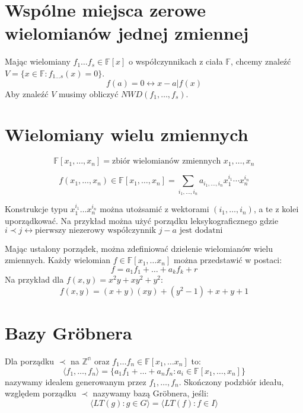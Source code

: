 \documentclass{../notatki}
\begin{document}
\section{Wspólne miejsca zerowe wielomianów jednej zmiennej}

Mając wielomiany $f_1 \dots f_s \in \mathbb{F}[x]$ o współczynnikach
z ciała $\mathbb{F}$, chcemy znaleźć $V = \{x \in \mathbb{F}: f_{1
\dots s}(x) = 0 \}$.
$$
f(a) = 0 \leftrightarrow x - a | f(x)
$$
Aby znaleźć $V$ musimy obliczyć $NWD(f_1, \dots, f_s)$.

\section{Wielomiany wielu zmiennych}

$$
\mathbb{F}[x_1, \dots, x_n] = \text{zbiór wielomianów zmiennych }
x_1, \dots, x_n
$$

$$
f(x_1, \dots, x_n) \in \mathbb{F}[x_1, \dots, x_n] = \sum_{i_1, \dots,
i_n} a_{i_1, \dots, i_n} x_1^{i_1} \cdots x_n^{i_n}
$$

Konstrukcje typu $x_1^{i_1} \dots x_n^{i_n}$ można utożsamić z
wektorami $(i_1, \dots, i_n)$, a te z kolei uporządkować. Na przykład można użyć
porządku leksykograficznego gdzie $i \prec j \leftrightarrow
\text{pierwszy niezerowy współczynnik } j - a \text{ jest dodatni}$

Mając ustalony porządek, można zdefiniować dzielenie wielomianów
wielu zmiennych. Każdy wielomian $f \in \mathbb{F}[x_1, \dots x_n]$
można przedstawić w postaci:
$$
f = a_1f_1 + \dots + a_kf_k + r
$$
Na przykład dla $f(x, y) = x^2y + xy^2 + y^2$:
$$
f(x, y) = (x + y)(xy) + (y^2 - 1) + x + y + 1
$$

\section{Bazy Gröbnera}

Dla porządku $\prec$ na $\mathbb{Z^n}$ oraz $f_1 \dots f_n \in
\mathbb{F}[x_1, \dots x_n]$ to:
$$
\langle f_1, \dots, f_n \rangle = \{a_1f_1 + \dots + a_nf_n : a_i \in
\mathbb{F}[x_1, \dots, x_n]\}
$$
nazywamy idealem generowanym przez $f_1, \dots, f_n$. Skończony podzbiór ideału,
względem porządku $\prec$ nazywamy bazą Gröbnera, jeśli:
$$
\langle LT(g) : g \in G \rangle = \langle LT(f) : f \in I \rangle
$$
\end{document}
